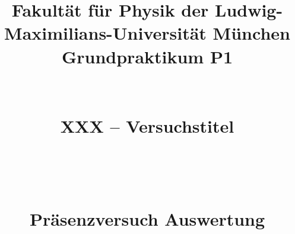 
\setlength{\parindent}{0pt}



\title{\large {\sf Fakult\"at f\"ur Physik der Ludwig-Maximilians-Universit\"at M\"unchen}\\
{\bf Grundpraktikum P1}\\ ~ \\ ~ \\
XXX -- Versuchstitel
\\ ~ \\ ~ \\ ~ \\
{\large Pr\"asenzversuch Auswertung}
}

\author{\workAuthor}

\date{\workDate}

\maketitle

\newpage
